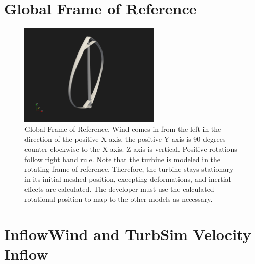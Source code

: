 \documentclass[11pt]{article}
\begin{document}

\section{Global Frame of Reference}

\begin{figure}[H]
\centering
\vspace{-12pt}
\includegraphics[trim={4cm 4cm 10cm 3cm},clip,width=0.6\textwidth]{./figs/global_FOR3.png}
\vspace{-5pt}
\caption{Global Frame of Reference.  Wind comes in from the left in the direction of the positive X-axis, the positive Y-axis is 90 degrees counter-clockwise to the X-axis.  Z-axis is vertical.  Positive rotations follow right hand rule. Note that the turbine is modeled in the rotating frame of reference.  Therefore, the turbine stays stationary in its initial meshed position, excepting deformations, and inertial effects are calculated.  The developer must use the calculated rotational position to map to the other models as necessary.}
\label{fig:ac_velocities}
\end{figure}

\section{InflowWind and TurbSim Velocity Inflow}
\end{document}
